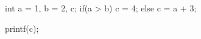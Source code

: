 \begin{minipage}[b]{2in}
\begin{AVerb}[numbers=left]
int a = 1, b = 2, c; \label{lst_back1_assign}
if(a > b) \label{lst_back1_test}
  c = 4; \label{lst_back1_test_true}
else     
  c = a + 3; \label{lst_back1_test_false}

printf(c); \label{lst_back1_print}
\end{AVerb}
\end{minipage}
